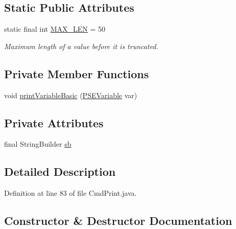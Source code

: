 \subsection*{Static Public Attributes}
\begin{DoxyCompactItemize}
\item 
static final int \hyperlink{classgov_1_1nasa_1_1jpf_1_1inspector_1_1client_1_1commands_1_1_cmd_print_1_1_value_printer_a89fe8bec98f986921e7e08f191ff9179}{M\+A\+X\+\_\+\+L\+EN} = 50
\begin{DoxyCompactList}\small\item\em Maximum length of a value before it is truncated. \end{DoxyCompactList}\end{DoxyCompactItemize}
\subsection*{Private Member Functions}
\begin{DoxyCompactItemize}
\item 
void \hyperlink{classgov_1_1nasa_1_1jpf_1_1inspector_1_1client_1_1commands_1_1_cmd_print_1_1_value_printer_aed27bc0c67ac2933c4b57723560e8e3d}{print\+Variable\+Basic} (\hyperlink{classgov_1_1nasa_1_1jpf_1_1inspector_1_1common_1_1pse_1_1_p_s_e_variable}{P\+S\+E\+Variable} var)
\end{DoxyCompactItemize}
\subsection*{Private Attributes}
\begin{DoxyCompactItemize}
\item 
final String\+Builder \hyperlink{classgov_1_1nasa_1_1jpf_1_1inspector_1_1client_1_1commands_1_1_cmd_print_1_1_value_printer_a86eacdeab16acd6491038a0d80c57f62}{sb}
\end{DoxyCompactItemize}


\subsection{Detailed Description}


Definition at line 83 of file Cmd\+Print.\+java.



\subsection{Constructor \& Destructor Documentation}
